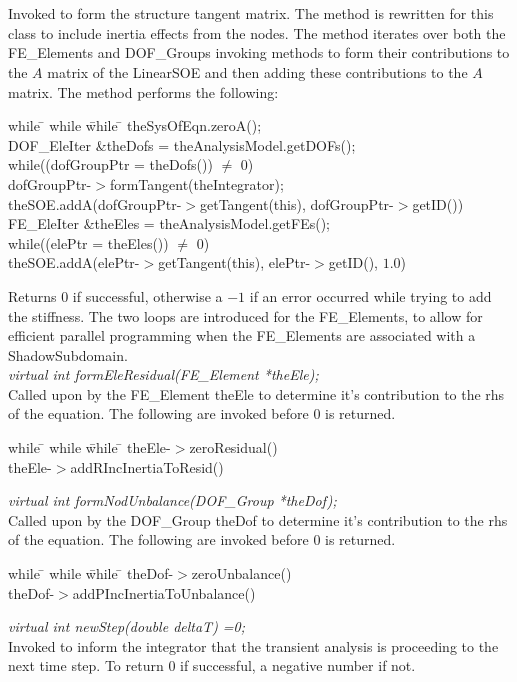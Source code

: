 \\
 \\
Invoked to form the structure tangent matrix. The method is rewritten
for this class to include inertia effects from the nodes. The method
iterates over both the FE\_Elements and DOF\_Groups invoking methods
to form their contributions to the $A$ matrix of the LinearSOE and
then adding these contributions to the $A$ matrix. The method performs
the following:
\begin{tabbing}
while \= \+ while \= while \= \kill
theSysOfEqn.zeroA();\\
DOF\_EleIter \&theDofs = theAnalysisModel.getDOFs();\\
while((dofGroupPtr = theDofs()) $\neq$ 0) \+ \\
dofGroupPtr-$>$formTangent(theIntegrator); \\
theSOE.addA(dofGroupPtr-$>$getTangent(this),
dofGroupPtr-$>$getID()) \- \\
FE\_EleIter \&theEles = theAnalysisModel.getFEs();\\
while((elePtr = theEles()) $\neq$ 0) \+ \\
theSOE.addA(elePtr-$>$getTangent(this),
elePtr-$>$getID(), $1.0$) \\
\end{tabbing}
\noindent Returns $0$ if successful, otherwise a $-1$ if an error occurred while
trying to add the stiffness. The two loops are introduced for the
FE\_Elements, to allow for efficient parallel programming when the
FE\_Elements are associated with a ShadowSubdomain.\\ 

{\em virtual int formEleResidual(FE\_Element *theEle);} \\
Called upon by the FE\_Element \p theEle to determine it's
contribution to the rhs of the equation. The following are invoked
before $0$ is returned.
\begin{tabbing}
while \= \+ while \= while \= \kill
theEle-$>$zeroResidual() \\
theEle-$>$addRIncInertiaToResid() \\
\end{tabbing}

{\em virtual int formNodUnbalance(DOF\_Group *theDof);} \\
Called upon by the DOF\_Group \p theDof to determine it's
contribution to the rhs of the equation. The following are invoked
before $0$ is returned.
\begin{tabbing}
while \= \+ while \= while \= \kill
theDof-$>$zeroUnbalance() \\
theDof-$>$addPIncInertiaToUnbalance() \\
\end{tabbing}

{\em virtual int newStep(double deltaT) =0;} \\
Invoked to inform the integrator that the transient analysis is
proceeding to the next time step. To return $0$ if successful, a
negative number if not.\\




